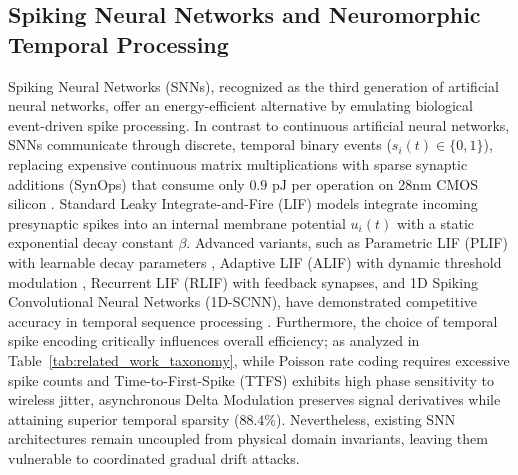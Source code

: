 \documentclass[journal]{IEEEtran}
\begin{document}
\subsection{Spiking Neural Networks and Neuromorphic Temporal Processing}
Spiking Neural Networks (SNNs), recognized as the third generation of artificial neural networks, offer an energy-efficient alternative by emulating biological event-driven spike processing. In contrast to continuous artificial neural networks, SNNs communicate through discrete, temporal binary events ($s_i(t) \in \{0, 1\}$), replacing expensive continuous matrix multiplications with sparse synaptic additions (SynOps) that consume only $0.9\text{ pJ}$ per operation on 28nm CMOS silicon \cite{davies2018loihi, saranirad2025cdna}. Standard Leaky Integrate-and-Fire (LIF) models integrate incoming presynaptic spikes into an internal membrane potential $u_i(t)$ with a static exponential decay constant $\beta$. Advanced variants, such as Parametric LIF (PLIF) with learnable decay parameters \cite{fang2021incorporating}, Adaptive LIF (ALIF) with dynamic threshold modulation \cite{bellec2020solution}, Recurrent LIF (RLIF) with feedback synapses, and 1D Spiking Convolutional Neural Networks (1D-SCNN), have demonstrated competitive accuracy in temporal sequence processing \cite{dalif2025decay, neftci2019surrogate}. Furthermore, the choice of temporal spike encoding critically influences overall efficiency; as analyzed in Table~\ref{tab:related_work_taxonomy}, while Poisson rate coding requires excessive spike counts and Time-to-First-Spike (TTFS) exhibits high phase sensitivity to wireless jitter, asynchronous Delta Modulation preserves signal derivatives while attaining superior temporal sparsity ($88.4\%$). Nevertheless, existing SNN architectures remain uncoupled from physical domain invariants, leaving them vulnerable to coordinated gradual drift attacks.
\end{document}
